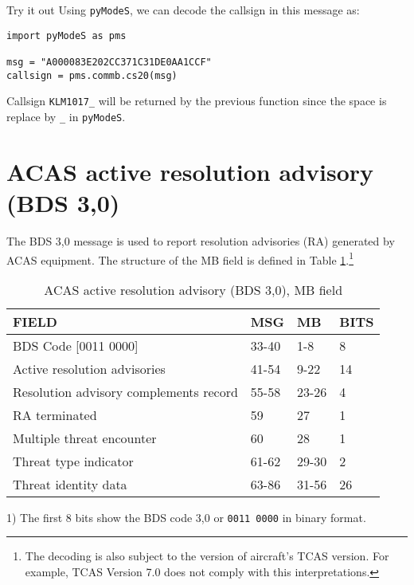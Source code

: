 \begin{notebox}{Try it out}
Using \texttt{pyModeS}, we can decode the callsign in this message as: 

\begin{verbatim}
import pyModeS as pms

msg = "A000083E202CC371C31DE0AA1CCF"
callsign = pms.commb.cs20(msg)
\end{verbatim}

Callsign \texttt{KLM1017\_} will be returned by the previous function since the space is replace by \texttt{\_} in \texttt{pyModeS}.
\end{notebox}


\clearpage

\section{ACAS active resolution advisory (BDS 3,0)}

The BDS 3,0 message is used to report resolution advisories (RA) generated by ACAS equipment. The structure of the MB field is defined in Table \ref{tb:bds20}.\footnote{The decoding is also subject to the version of aircraft's TCAS version. For example, TCAS Version 7.0 does not comply with this interpretations.}

\begin{table}[ht]
\centering
\caption{ACAS active resolution advisory (BDS 3,0), MB field}
\label{tb:bds20}
\begin{tabular}{|l|l|l|l|}
\hline
\textbf{FIELD} & \textbf{MSG} & \textbf{MB} & \textbf{BITS} \\ \hline
BDS Code {[}0011 0000{]} & 33-40 & 1-8 & 8 \\ \hline
Active resolution advisories & 41-54 & 9-22 & 14 \\ \hline
Resolution advisory complements record & 55-58 & 23-26 & 4 \\ \hline
RA terminated & 59 & 27 & 1 \\ \hline
Multiple threat encounter & 60 & 28 & 1 \\ \hline
Threat type indicator & 61-62 & 29-30 & 2 \\ \hline
Threat identity data & 63-86 & 31-56 & 26 \\ \hline
\end{tabular}
\end{table}


1) The first 8 bits show the BDS code 3,0 or \texttt{0011 0000} in binary format.

